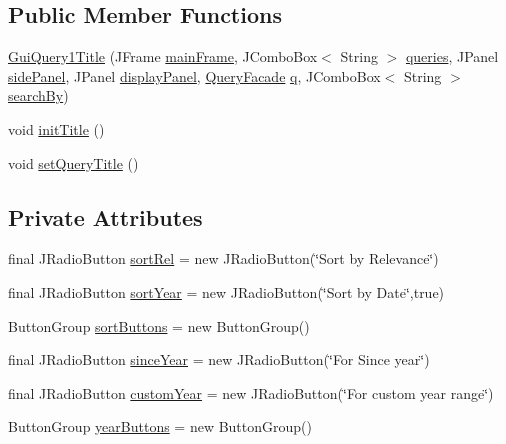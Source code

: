 \subsection*{Public Member Functions}
\begin{DoxyCompactItemize}
\item 
\hyperlink{classGuiQuery1Title_a1280b921b2d0ad92b60e8053e0e3c704}{Gui\+Query1\+Title} (J\+Frame \hyperlink{classGUIQuery_aba988b5bec899d53480a472de7b87dfa}{main\+Frame}, J\+Combo\+Box$<$ String $>$ \hyperlink{classGUIQuery_a0db8bd960b4512cadf9aa40642934680}{queries}, J\+Panel \hyperlink{classGUIQuery_a70e233b1f14874166b7707edebe825d2}{side\+Panel}, J\+Panel \hyperlink{classGUIQuery_a8b4dbf257e0859c597591f072349b75c}{display\+Panel}, \hyperlink{classQueryFacade}{Query\+Facade} \hyperlink{classGUIQuery_a2a20445d749185552014142b78f3e071}{q}, J\+Combo\+Box$<$ String $>$ \hyperlink{classGuiQuery1_a021ae2f4fa2ec342496af6ac434995f4}{search\+By})
\item 
void \hyperlink{classGuiQuery1Title_a5ef02fd3f5472ff67fc24efce9d47e50}{init\+Title} ()
\item 
void \hyperlink{classGuiQuery1Title_ab549b18802bf2e90895154fbb4d9d51b}{set\+Query\+Title} ()
\end{DoxyCompactItemize}
\subsection*{Private Attributes}
\begin{DoxyCompactItemize}
\item 
final J\+Radio\+Button \hyperlink{classGuiQuery1Title_aff3f4abd05828888c376d91e9c72ae3f}{sort\+Rel} = new J\+Radio\+Button(\char`\"{}Sort by Relevance\char`\"{})
\item 
final J\+Radio\+Button \hyperlink{classGuiQuery1Title_a282ba6983218ab020c0fe9b65a0c5619}{sort\+Year} = new J\+Radio\+Button(\char`\"{}Sort by Date\char`\"{},true)
\item 
Button\+Group \hyperlink{classGuiQuery1Title_a92ce684b789aae7c807f5041ac8f7b54}{sort\+Buttons} = new Button\+Group()
\item 
final J\+Radio\+Button \hyperlink{classGuiQuery1Title_a57f5240e22a35a95739062b91bdd4cba}{since\+Year} = new J\+Radio\+Button(\char`\"{}For Since year\char`\"{})
\item 
final J\+Radio\+Button \hyperlink{classGuiQuery1Title_aa7c8f24ee5498bd7808133f52a585449}{custom\+Year} = new J\+Radio\+Button(\char`\"{}For custom year range\char`\"{})
\item 
Button\+Group \hyperlink{classGuiQuery1Title_ac28a3c0196f225f9048778b102a57663}{year\+Buttons} = new Button\+Group()
\end{DoxyCompactItemize}
